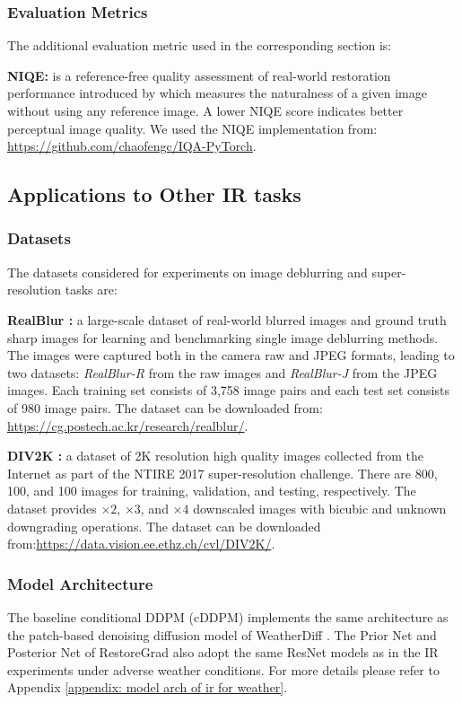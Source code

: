 \subsubsection{Evaluation Metrics}
The additional evaluation metric used in the corresponding section is:

\noindent\textbf{NIQE:} is a reference-free quality assessment of real-world restoration performance introduced by \citet{mittal2012making} which measures the naturalness of a given image without using any reference image. A lower NIQE score indicates better perceptual image quality. We used the NIQE implementation from: \url{https://github.com/chaofengc/IQA-PyTorch}.


\subsection{Applications to Other IR tasks}

\subsubsection{Datasets}

The datasets considered for experiments on image deblurring and super-resolution tasks are:

\noindent\textbf{RealBlur \citep{rim_2020_ECCV}:} a large-scale dataset of real-world blurred images and ground truth sharp images for learning and benchmarking single image deblurring methods. The images were captured both in the camera raw and JPEG formats, leading to two datasets: \textit{RealBlur-R} from the raw images and \textit{RealBlur-J} from the JPEG images. Each training set consists of 3,758 image pairs and each test set consists of 980 image pairs. The dataset can be downloaded from: \url{https://cg.postech.ac.kr/research/realblur/}.

\noindent\textbf{DIV2K \citep{Agustsson_2017_CVPR_Workshops,Timofte_2017_CVPR_Workshops}:} a dataset of 2K resolution high quality images collected from the Internet as part of the NTIRE 2017 super-resolution challenge. There are 800, 100, and 100 images for training, validation, and testing, respectively. The dataset provides $\times2$, $\times3$, and $\times4$ downscaled images with bicubic and unknown downgrading operations. The dataset can be downloaded from:\url{https://data.vision.ee.ethz.ch/cvl/DIV2K/}.


\subsubsection{Model Architecture}
The baseline conditional DDPM (cDDPM) implements the same architecture as the patch-based denoising diffusion model of WeatherDiff \citep{ozdenizci2023restoring}. The Prior Net and Posterior Net of RestoreGrad also adopt the same ResNet models as in the IR experiments under adverse weather conditions. For more details please refer to Appendix \ref{appendix: model arch of ir for weather}.

